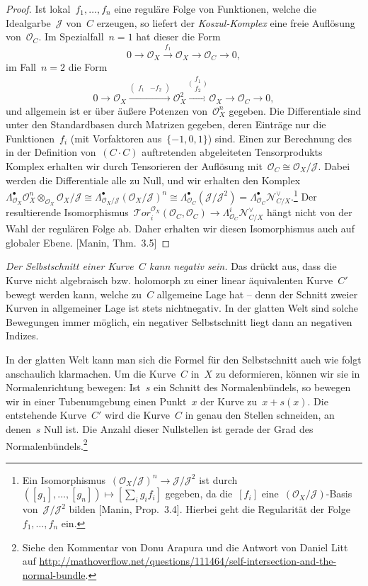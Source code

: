 \documentclass[a4paper,ngerman,12pt]{scrartcl}
\theoremstyle{definition}
\theoremstyle{plain}
\theoremstyle{remark}
\newcommand{\N}{\mathcal{N}}
\newcommand{\J}{\mathcal{J}}
\renewcommand{\O}{\mathcal{O}}
\newcommand{\lra}{\longrightarrow}
\begin{document}
\begin{proof}Ist lokal~$f_1,\ldots,f_n$ eine reguläre Folge von
Funktionen, welche die Idealgarbe~$\J$ von~$C$ erzeugen, so liefert der
\emph{Koszul-Komplex} eine freie Auflösung von~$\O_C$. Im Spezialfall~$n = 1$
hat dieser die Form
\[ 0 \lra \O_X \stackrel{f_1} \lra \O_X \lra \O_C \lra 0, \]
im Fall~$n = 2$ die Form
\[ 0 \lra \O_X \stackrel{(\begin{smallmatrix}f_1&-f_2\end{smallmatrix})} \lra \O_X^2
  \stackrel{\bigl(\begin{smallmatrix}f_1\\f_2\end{smallmatrix}\bigr)}{\lra} \O_X \lra \O_C \lra 0,
  \]
und allgemein ist er über äußere Potenzen von~$\O_X^n$ gegeben. Die Differentiale
sind unter den Standardbasen durch Matrizen gegeben, deren Einträge nur
die Funktionen~$f_i$ (mit Vorfaktoren aus~$\{-1,0,1\}$) sind. Einen zur
Berechnung des in der Definition von~$(C \cdot C)$ auftretenden abgeleiteten
Tensorprodukts Komplex erhalten wir durch Tensorieren der Auflösung mit~$\O_C
\cong \O_X/\J$. Dabei werden die Differentiale alle zu Null, und wir erhalten
den Komplex~$\Lambda^\bullet_{\O_X} \O_X^n \otimes_{\O_X} \O_X/\J \cong
\Lambda^\bullet_{\O_X/\J} (\O_X/\J)^n \cong
\Lambda^\bullet_{\O_C}(\J/\J^2) = \Lambda^\bullet_{\O_C}
\N_{C/X}^\vee$.\footnote{Ein Isomorphismus~$(\O_X/\J)^n \to \J/\J^2$ ist
durch~$([g_1],\ldots,[g_n]) \mapsto [\sum_i g_i f_i]$ gegeben, da die~$[f_i]$
eine~$(\O_X/\J)$-Basis von~$\J/\J^2$ bilden [Manin, Prop.~3.4]. Hierbei geht
die Regularität der Folge~$f_1,\ldots,f_n$ ein.}
Der resultierende Isomorphismus~$\mathcal{T}\!or^{\O_X}_i(\O_C,\O_C) \to \Lambda^i_{\O_C}
\N_{C/X}^\vee$ hängt nicht von der Wahl der regulären Folge ab. Daher erhalten
wir diesen Isomorphismus auch auf globaler Ebene. [Manin, Thm.~3.5]
\end{proof}

\emph{Der Selbstschnitt einer Kurve~$C$ kann negativ sein.} Das drückt aus, dass
die Kurve nicht algebraisch bzw. holomorph zu einer linear äquivalenten
Kurve~$C'$ bewegt werden kann, welche zu~$C$ allgemeine Lage hat -- denn der
Schnitt zweier Kurven in allgemeiner Lage ist stets nichtnegativ. In der
glatten Welt sind solche Bewegungen immer möglich, ein negativer Selbstschnitt
liegt dann an negativen Indizes.

In der glatten Welt kann man sich die Formel für den Selbstschnitt auch wie
folgt anschaulich klarmachen. Um die Kurve~$C$ in~$X$ zu deformieren, können
wir sie in Normalenrichtung bewegen: Ist~$s$ ein Schnitt des Normalenbündels,
so bewegen wir in einer Tubenumgebung einen Punkt~$x$ der Kurve zu~$x + s(x)$.
Die entstehende Kurve~$C'$ wird die Kurve~$C$ in genau den Stellen schneiden,
an denen~$s$ Null ist. Die Anzahl dieser Nullstellen ist gerade der Grad des
Normalenbündels.\footnote{Siehe den Kommentar von Donu Arapura und die Antwort
von Daniel Litt auf
\url{http://mathoverflow.net/questions/111464/self-intersection-and-the-normal-bundle}.}
\end{document}
